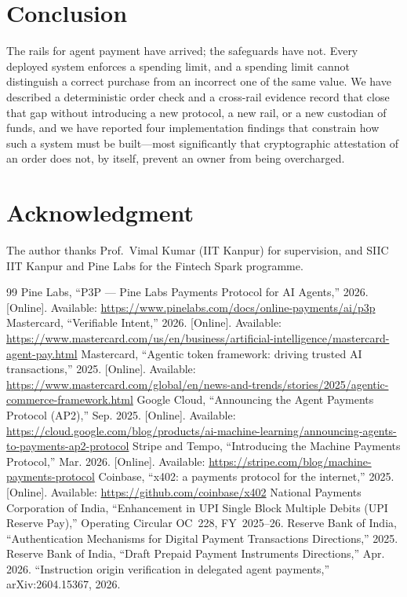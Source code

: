 \documentclass[journal,onecolumn,11pt]{IEEEtran}
\begin{document}
\section{Conclusion}
The rails for agent payment have arrived; the safeguards have not. Every deployed
system enforces a spending limit, and a spending limit cannot distinguish a correct
purchase from an incorrect one of the same value. We have described a deterministic
order check and a cross-rail evidence record that close that gap without introducing a
new protocol, a new rail, or a new custodian of funds, and we have reported four
implementation findings that constrain how such a system must be built---most
significantly that cryptographic attestation of an order does not, by itself, prevent
an owner from being overcharged.

\section*{Acknowledgment}
The author thanks Prof.\ Vimal Kumar (IIT Kanpur) for supervision, and SIIC IIT Kanpur
and Pine Labs for the Fintech Spark programme.

\begin{thebibliography}{99}
 Pine Labs, ``P3P --- Pine Labs Payments Protocol for AI Agents,''
2026. [Online]. Available: \url{https://www.pinelabs.com/docs/online-payments/ai/p3p}
 Mastercard, ``Verifiable Intent,'' 2026. [Online]. Available:
\url{https://www.mastercard.com/us/en/business/artificial-intelligence/mastercard-agent-pay.html}
 Mastercard, ``Agentic token framework: driving trusted AI
transactions,'' 2025. [Online]. Available:
\url{https://www.mastercard.com/global/en/news-and-trends/stories/2025/agentic-commerce-framework.html}
 Google Cloud, ``Announcing the Agent Payments Protocol (AP2),'' Sep.
2025. [Online]. Available:
\url{https://cloud.google.com/blog/products/ai-machine-learning/announcing-agents-to-payments-ap2-protocol}
 Stripe and Tempo, ``Introducing the Machine Payments Protocol,'' Mar.
2026. [Online]. Available: \url{https://stripe.com/blog/machine-payments-protocol}
 Coinbase, ``x402: a payments protocol for the internet,'' 2025.
[Online]. Available: \url{https://github.com/coinbase/x402}
 National Payments Corporation of India, ``Enhancement in UPI Single
Block Multiple Debits (UPI Reserve Pay),'' Operating Circular OC~228, FY~2025--26.
 Reserve Bank of India, ``Authentication Mechanisms for Digital
Payment Transactions Directions,'' 2025.
 Reserve Bank of India, ``Draft Prepaid Payment Instruments
Directions,'' Apr. 2026.
 ``Instruction origin verification in delegated agent payments,''
arXiv:2604.15367, 2026.
\end{thebibliography}
\end{document}
